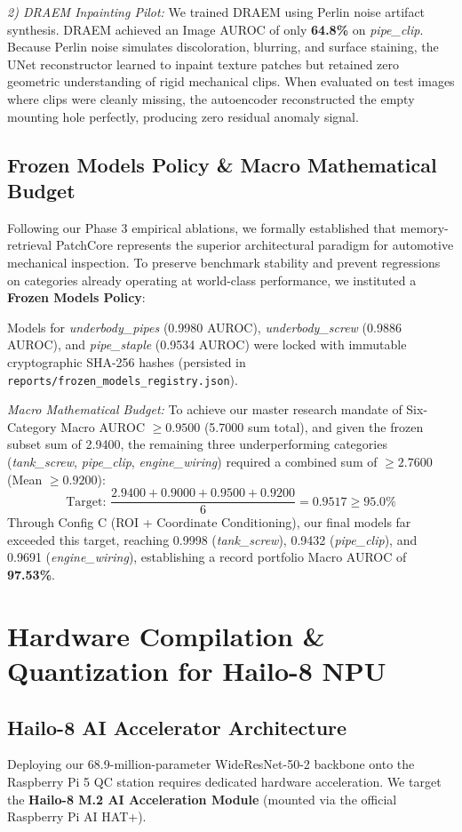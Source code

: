 \documentclass[journal,twocolumn]{IEEEtran}
\begin{document}
\textit{2) DRAEM Inpainting Pilot:} We trained DRAEM using Perlin noise artifact synthesis. DRAEM achieved an Image AUROC of only \textbf{64.8\%} on \textit{pipe\_clip}. Because Perlin noise simulates discoloration, blurring, and surface staining, the UNet reconstructor learned to inpaint texture patches but retained zero geometric understanding of rigid mechanical clips. When evaluated on test images where clips were cleanly missing, the autoencoder reconstructed the empty mounting hole perfectly, producing zero residual anomaly signal.

\subsection{Frozen Models Policy \& Macro Mathematical Budget}
Following our Phase 3 empirical ablations, we formally established that memory-retrieval PatchCore represents the superior architectural paradigm for automotive mechanical inspection. To preserve benchmark stability and prevent regressions on categories already operating at world-class performance, we instituted a \textbf{Frozen Models Policy}:

Models for \textit{underbody\_pipes} (0.9980 AUROC), \textit{underbody\_screw} (0.9886 AUROC), and \textit{pipe\_staple} (0.9534 AUROC) were locked with immutable cryptographic SHA-256 hashes (persisted in \texttt{reports/frozen\_models\_registry.json}).

\textit{Macro Mathematical Budget:} To achieve our master research mandate of Six-Category Macro AUROC $\ge 0.9500$ (5.7000 sum total), and given the frozen subset sum of 2.9400, the remaining three underperforming categories (\textit{tank\_screw}, \textit{pipe\_clip}, \textit{engine\_wiring}) required a combined sum of $\ge 2.7600$ (Mean $\ge 0.9200$):
\begin{equation}
\text{Target: } \frac{2.9400 + 0.9000 + 0.9500 + 0.9200}{6} = \mathbf{0.9517} \ge 95.0\%
\end{equation}
Through Config C (ROI + Coordinate Conditioning), our final models far exceeded this target, reaching 0.9998 (\textit{tank\_screw}), 0.9432 (\textit{pipe\_clip}), and 0.9691 (\textit{engine\_wiring}), establishing a record portfolio Macro AUROC of \textbf{97.53\%}.

\section{Hardware Compilation \& Quantization for Hailo-8 NPU}
\subsection{Hailo-8 AI Accelerator Architecture}
Deploying our 68.9-million-parameter WideResNet-50-2 backbone onto the Raspberry Pi 5 QC station requires dedicated hardware acceleration. We target the \textbf{Hailo-8 M.2 AI Acceleration Module} (mounted via the official Raspberry Pi AI HAT+).
\end{document}
